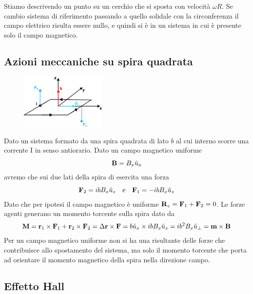 Stiamo descrivendo un punto su un cerchio che si sposta con velocit\`a $\omega R$. Se cambio sistema di riferimento passando a quello solidale con la circonferenza il campo elettrico risulta essere nullo, e quindi si \`e in un sistema in cui \`e presente solo il campo magnetico.

\subsection{Azioni meccaniche su spira quadrata}

\begin{figure} %
\vspace{-1cm}
    \centering
    \includegraphics[width=0.38\textwidth]{images/squarespire} %
\end{figure}
Dato un sistema formato da una spira quadrata di lato $b$ al cui interno scorre una corrente I in senso antiorario. Dato un campo magnetico uniforme
\begin{equation*}
	\bold{B} = B_x \hat{u}_{x}
\end{equation*}
avremo che sui due lati della spira di esercita una forza 
\begin{equation*}
	\bold{F}_{2} = ibB_x \hat{u}_{z} \quad \text{e} \quad \bold{F}_{1} = -ibB_x \hat{u}_{z}
\end{equation*}
Dato che per ipotesi il campo magnetico \`e uniforme $\bold{R}_{z} = \bold{F}_{1} + \bold{F}_{2} = 0$. Le forze agenti generano un momento torcente sulla spira dato da 
\begin{equation*}
	\bold{M} = \bold{r}_{1} \times \bold{F}_{1} + \bold{r}_{2} \times \bold{F}_{2} = \Delta \bold{r} \times \bold{F} = b\hat{u}_{x} \times ibB_x \hat{u}_{z} = ib^2B_x \hat{u}_{\perp} = \bold{m} \times \bold{B}
\end{equation*}
Per un campo magnetico uniforme non si ha una risultante delle forze che contribuisce allo spostamento del sistema, ma solo il momento torcente che porta ad orientare il momento magnetico della spira nella direzione campo.

\subsection{Effetto Hall}

